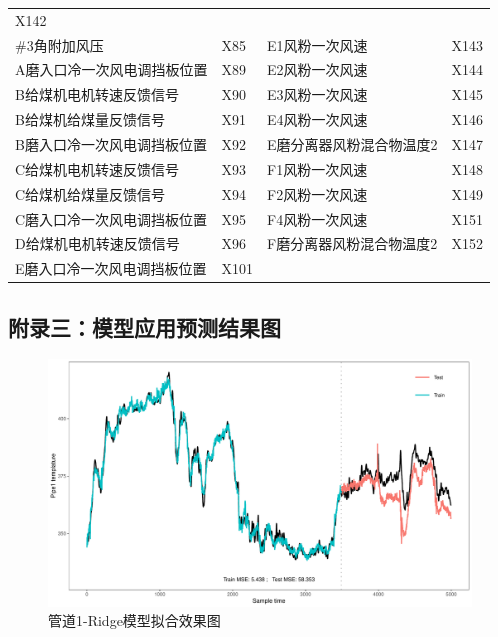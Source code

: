 \documentclass[
]{article}
\begin{document}
\begin{longtable}[]{@{}llll@{}}
X142\tabularnewline
\#3角附加风压 & X85 & E1风粉一次风速 & X143\tabularnewline
A磨入口冷一次风电调挡板位置 & X89 & E2风粉一次风速 & X144\tabularnewline
B给煤机电机转速反馈信号 & X90 & E3风粉一次风速 & X145\tabularnewline
B给煤机给煤量反馈信号 & X91 & E4风粉一次风速 & X146\tabularnewline
B磨入口冷一次风电调挡板位置 & X92 & E磨分离器风粉混合物温度2 &
X147\tabularnewline
C给煤机电机转速反馈信号 & X93 & F1风粉一次风速 & X148\tabularnewline
C给煤机给煤量反馈信号 & X94 & F2风粉一次风速 & X149\tabularnewline
C磨入口冷一次风电调挡板位置 & X95 & F4风粉一次风速 & X151\tabularnewline
D给煤机电机转速反馈信号 & X96 & F磨分离器风粉混合物温度2 &
X152\tabularnewline
E磨入口冷一次风电调挡板位置 & X101 & &\tabularnewline
\bottomrule
\end{longtable}

\hypertarget{ux9644ux5f55ux4e09ux6a21ux578bux5e94ux7528ux9884ux6d4bux7ed3ux679cux56fe}{%
\subsection{附录三：模型应用预测结果图}\label{ux9644ux5f55ux4e09ux6a21ux578bux5e94ux7528ux9884ux6d4bux7ed3ux679cux56fe}}

\begin{figure}

{\centering \includegraphics{TJRJCP_DuXingx_202105_files/figure-latex/unnamed-chunk-29-1} 

}

\caption{管道1-Ridge模型拟合效果图}\label{fig:unnamed-chunk-29}
\end{figure}
\end{document}
